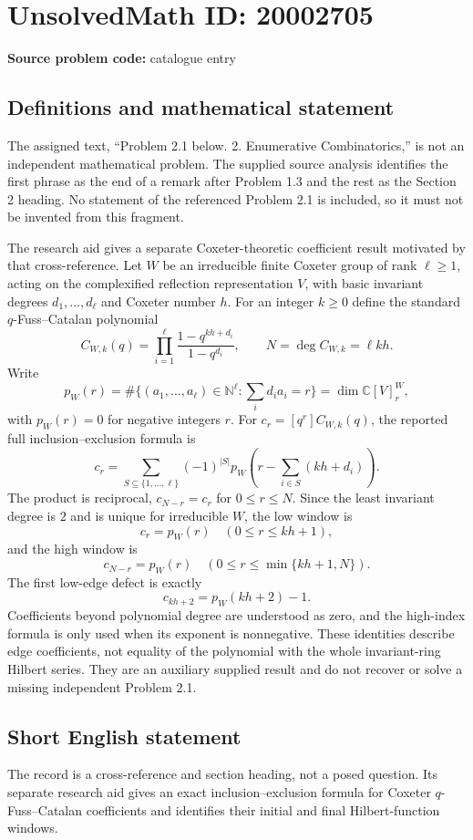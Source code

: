 \documentclass[11pt]{article}
\newcommand{\N}{\mathbb{N}}
\newcommand{\C}{\mathbb{C}}
\begin{document}
\section*{UnsolvedMath ID: 20002705}
\textbf{Source problem code:} catalogue entry
\subsection{Definitions and mathematical statement}
The assigned text, ``Problem 2.1 below. 2. Enumerative Combinatorics,'' is not an independent mathematical problem. The supplied source analysis identifies the first phrase as the end of a remark after Problem 1.3 and the rest as the Section 2 heading. No statement of the referenced Problem 2.1 is included, so it must not be invented from this fragment.

The research aid gives a separate Coxeter-theoretic coefficient result motivated by that cross-reference. Let $W$ be an irreducible finite Coxeter group of rank $\ell\ge1$, acting on the complexified reflection representation $V$, with basic invariant degrees $d_1,\ldots,d_\ell$ and Coxeter number $h$. For an integer $k\ge0$ define the standard $q$-Fuss--Catalan polynomial
\[
 C_{W,k}(q)=\prod_{i=1}^\ell
                  \frac{1-q^{kh+d_i}}{1-q^{d_i}},
 \qquad N=\deg C_{W,k}=\ell kh.
\]
Write
\[
 p_W(r)=\#\{(a_1,\ldots,a_\ell)\in\N^\ell:
                     \sum_i d_i a_i=r\}
       =\dim\C[V]^W_r,
\]
with $p_W(r)=0$ for negative integers $r$. For $c_r=[q^r]C_{W,k}(q)$, the reported full inclusion--exclusion formula is
\[
 c_r=\sum_{S\subseteq\{1,\ldots,\ell\}}(-1)^{|S|}
       p_W\left(r-\sum_{i\in S}(kh+d_i)\right).
\]
The product is reciprocal, $c_{N-r}=c_r$ for $0\le r\le N$. Since the least invariant degree is $2$ and is unique for irreducible $W$, the low window is
\[
 c_r=p_W(r)\quad(0\le r\le kh+1),
\]
and the high window is
\[
 c_{N-r}=p_W(r)\quad(0\le r\le\min\{kh+1,N\}).
\]
The first low-edge defect is exactly
\[
 c_{kh+2}=p_W(kh+2)-1.
\]
Coefficients beyond polynomial degree are understood as zero, and the high-index formula is only used when its exponent is nonnegative. These identities describe edge coefficients, not equality of the polynomial with the whole invariant-ring Hilbert series. They are an auxiliary supplied result and do not recover or solve a missing independent Problem 2.1.
\subsection{Short English statement}
The record is a cross-reference and section heading, not a posed question. Its separate research aid gives an exact inclusion--exclusion formula for Coxeter $q$-Fuss--Catalan coefficients and identifies their initial and final Hilbert-function windows.
\end{document}
